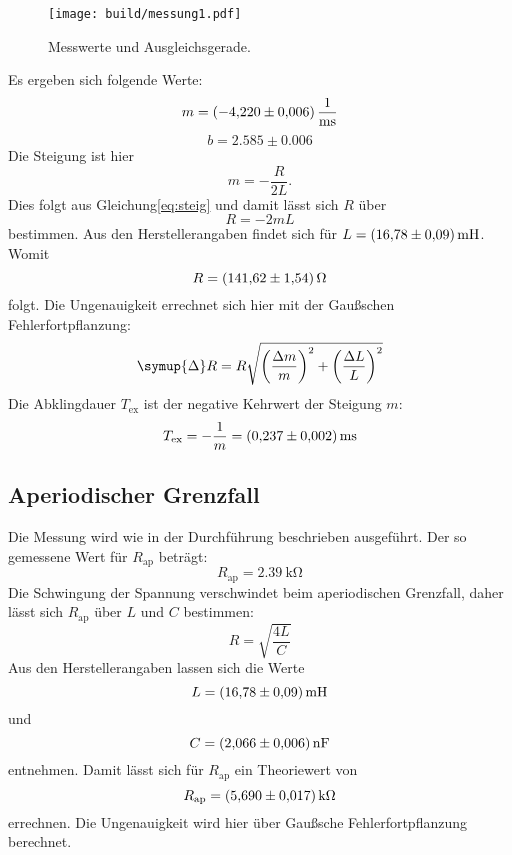 \begin{figure}
    \centering
    \texttt{[image: build/messung1.pdf]}
    \caption{Messwerte und Ausgleichsgerade.}
    \label{fig:plot1}
\end{figure}
\noindent Es ergeben sich folgende Werte:
\begin{equation*}
  m=\SI{-4.22\pm0.006}{\per\milli\second}
\end{equation*}
\begin{equation*}
  b=2.585\pm0.006
\end{equation*}
Die Steigung ist hier
\begin{equation*}
  m=-\frac{R}{2L}.
\end{equation*}
Dies folgt aus Gleichung\eqref{eq:steig} und damit lässt sich $R$ über
\begin{equation*}
  R=-2mL
\end{equation*}
bestimmen.
Aus den Herstellerangaben findet sich für $L=\SI{16.78\pm0.09}{\milli\henry}$.
Womit
\begin{equation*}
  R=\SI{141.62\pm1.54}{\ohm}
\end{equation*}
folgt.
Die Ungenauigkeit errechnet sich hier mit der Gaußschen Fehlerfortpflanzung:
\begin{equation*}
  \symup{\Delta} R= R\sqrt{\left(\frac{\Delta m}{m}\right)^2 + \left(\frac{\Delta L}{L}\right)^2}
\end{equation*}
Die Abklingdauer $T_\text{ex}$ ist der negative Kehrwert der Steigung $m$:
\begin{equation*}
  T_\text{ex}= -\frac{1}{m} = \SI{0.237\pm0.002}{\milli\second}
\end{equation*}


\subsection{Aperiodischer Grenzfall}
Die Messung wird wie in der Durchführung beschrieben ausgeführt.
Der so gemessene Wert für $R_\text{ap}$ beträgt:
\begin{equation*}
  R_\text{ap}=\SI{2.39}{\kilo\ohm}
\end{equation*}
Die Schwingung der Spannung verschwindet beim aperiodischen Grenzfall, daher lässt sich $R_\text{ap}$ über $L$ und $C$ bestimmen:
\begin{equation*}
  R=\sqrt{\frac{4L}{C}}
\end{equation*}
Aus den Herstellerangaben lassen sich die Werte
\begin{equation*}
  L=\SI{16.78\pm0.09}{\milli\henry}
\end{equation*}
und
\begin{equation*}
  C=\SI{2.066\pm0.006}{\nano\farad}
\end{equation*}
entnehmen.
Damit lässt sich für $R_\text{ap}$ ein Theoriewert von
\begin{equation*}
  R_\text{ap}=\SI{5.69\pm0.017}{\kilo\ohm}
\end{equation*}
errechnen.
Die Ungenauigkeit wird hier über Gaußsche Fehlerfortpflanzung berechnet.

